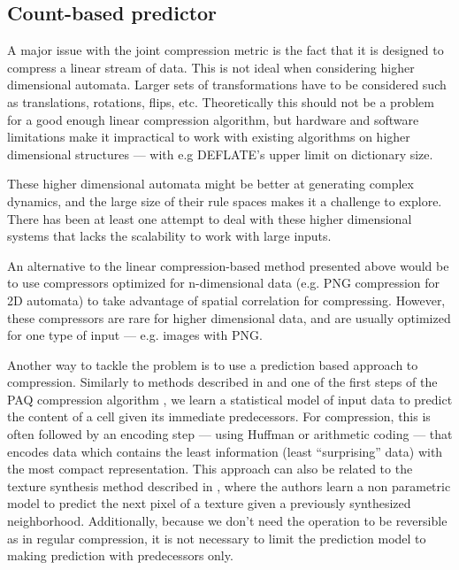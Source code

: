 \subsection{Count-based predictor}\label{sec:count-based-pred}

A major issue with the joint compression metric is the fact that it is designed
to compress a linear stream of data. This is not ideal when considering higher
dimensional automata. Larger sets of transformations have to be
considered such as translations, rotations, flips, etc. Theoretically this
should not be a problem for a good enough linear compression algorithm, but
hardware and software limitations make it impractical to work with existing
algorithms on higher dimensional structures --- with e.g DEFLATE's upper limit
on dictionary size.

These higher dimensional automata might be better at generating complex
dynamics, and the large size of their rule spaces makes it a challenge to
explore. There has been at least one attempt to deal with these higher
dimensional systems \parencite{zenilTwodimensionalKolmogorovComplexity2015} that lacks the scalability
to work with large inputs.

An alternative to the linear compression-based method presented above would be
to use compressors optimized for n-dimensional data (e.g. PNG compression for 2D
automata) to take advantage of spatial correlation for compressing. However,
these compressors are rare for higher dimensional data, and are usually
optimized for one type of input --- e.g. images with PNG.

Another way to tackle the problem is to use a prediction based approach to
compression. Similarly to methods described in
\parencite{schmidhuberSequentialNeuralText1996} and one of the first steps of the PAQ
compression algorithm \parencite{mahoneyFastTextCompression2000}, we learn a statistical model of
input data to predict the content of a cell given its immediate predecessors.
For compression, this is often followed by an encoding step --- using Huffman or
arithmetic coding --- that encodes data which contains the least information
(least ``surprising'' data) with the most compact representation. This approach
can also be related to the texture synthesis method described in
\parencite{efrosTextureSynthesisNonparametric1999}, where the authors learn a non parametric model to
predict the next pixel of a texture given a previously synthesized neighborhood.
Additionally, because we don't need the operation to be reversible as in regular
compression, it is not necessary to limit the prediction model to making
prediction with predecessors only.

